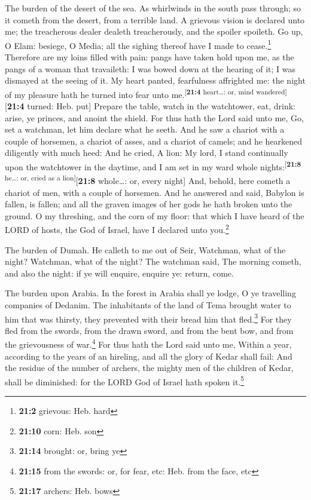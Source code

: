  The burden of the desert of the sea. As whirlwinds in the
south pass through; so it cometh from the desert, from a terrible land.
 A grievous vision is declared unto me; the treacherous
dealer dealeth treacherously, and the spoiler spoileth. Go up, O Elam:
besiege, O Media; all the sighing thereof have I made to
cease.\footnote{\textbf{21:2} grievous: Heb. hard} 
Therefore are my loins filled with pain: pangs have taken hold upon me,
as the pangs of a woman that travaileth: I was bowed down at the hearing
of it; I was dismayed at the seeing of it.  My heart
panted, fearfulness affrighted me: the night of my pleasure hath he
turned into fear unto me.\textsuperscript{{[}\textbf{21:4} heart\ldots:
or, mind wandered{]}}{[}\textbf{21:4} turned: Heb. put{]} 
Prepare the table, watch in the watchtower, eat, drink: arise, ye
princes, and anoint the shield.  For thus hath the Lord
said unto me, Go, set a watchman, let him declare what he seeth.
 And he saw a chariot with a couple of horsemen, a chariot
of asses, and a chariot of camels; and he hearkened diligently with much
heed:  And he cried, A lion: My lord, I stand continually
upon the watchtower in the daytime, and I am set in my ward whole
nights:\textsuperscript{{[}\textbf{21:8} he\ldots: or, cried as a
lion{]}}{[}\textbf{21:8} whole\ldots: or, every night{]} 
And, behold, here cometh a chariot of men, with a couple of horsemen.
And he answered and said, Babylon is fallen, is fallen; and all the
graven images of her gods he hath broken unto the ground.
 O my threshing, and the corn of my floor: that which I
have heard of the LORD of hosts, the God of Israel, have I declared unto
you.\footnote{\textbf{21:10} corn: Heb. son}

 The burden of Dumah. He calleth to me out of Seir,
Watchman, what of the night? Watchman, what of the night?
 The watchman said, The morning cometh, and also the
night: if ye will enquire, enquire ye: return, come.

 The burden upon Arabia. In the forest in Arabia shall ye
lodge, O ye travelling companies of Dedanim.  The
inhabitants of the land of Tema brought water to him that was thirsty,
they prevented with their bread him that fled.\footnote{\textbf{21:14}
  brought: or, bring ye}  For they fled from the swords,
from the drawn sword, and from the bent bow, and from the grievousness
of war.\footnote{\textbf{21:15} from the swords: or, for fear, etc: Heb.
  from the face, etc}  For thus hath the Lord said unto
me, Within a year, according to the years of an hireling, and all the
glory of Kedar shall fail:  And the residue of the number
of archers, the mighty men of the children of Kedar, shall be
diminished: for the LORD God of Israel hath spoken it.\footnote{\textbf{21:17}
  archers: Heb. bows}

